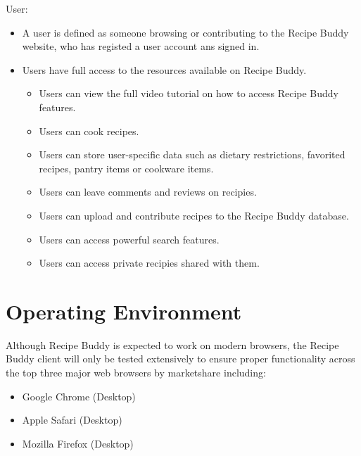 \documentclass{scrreprt}
\begin{document}
User:
\begin{itemize}
    \item A user is defined as someone browsing or contributing to the \gls{Recipe Buddy} website, who has registed a user account ans signed in.
    \item Users have full access to the resources available on \gls{Recipe Buddy}.
          \begin{itemize}
              \item Users can view the full video tutorial on how to access \gls{Recipe Buddy} features.
              \item Users can cook recipes.
              \item Users can store user-specific data such as dietary restrictions, favorited recipes, pantry items or cookware items.
              \item Users can leave comments and reviews on recipies.
              \item Users can upload and contribute recipes to the \gls{Recipe Buddy} database.
              \item Users can access powerful search features.
              \item Users can access private recipies shared with them.
          \end{itemize}
\end{itemize}

\section{Operating Environment}
Although \gls{Recipe Buddy} is expected to work on modern browsers, the \gls{Recipe Buddy} client will only be tested extensively to ensure proper functionality across the top three major web browsers by marketshare including:
\begin{itemize}
    \item Google Chrome (Desktop)
    \item Apple Safari (Desktop)
    \item Mozilla Firefox (Desktop)
\end{itemize}
\end{document}
